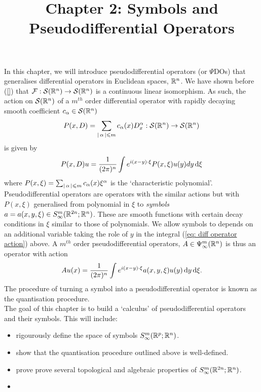 \documentclass[12pt]{article}
\title{Chapter 2: Symbols and Pseudodifferential Operators}
\date{}
\begin{document}
\maketitle
In this chapter, we will introduce pseudodifferential operators (or $\Psi$DOs) that generalises differential operators in Euclidean spaces, $\R^n$. We have shown before (\ref{}) that $\F : \sch(\R^n) \to \sch(\R^n)$ is a continuous linear isomorphism. As such, the action on $\sch(\R^n)$ of a $m^{th}$ order differential operator with rapidly decaying smooth coefficient $c_\alpha \in \sch(\R^n)$ 
\begin{align}
P(x, D) = \sum_{\abs{\alpha} \leq m } c_\alpha(x) D^\alpha_x : \sch(\R^n) \to \sch(\R^n) \label{eq: general diff op} 
\end{align}
is given by 
\begin{align}
P(x, D)u = \frac{1}{(2\pi)^n} \int e^{i (x - y) \cdot \xi} P(x, \xi) u(y) dy \d[\xi]  \label{eq: diff operator action} 
\end{align}
where $P(x, \xi) = \sum_{\abs{\alpha} \leq m} c_\alpha(x) \xi^\alpha$ is the `characteristic polynomial'. \\

Pseudodifferential operators are operators with the similar actions but with $P(x, \xi)$ generalised from polynomial in $\xi$ to \textit{symbols} $a = a(x, y, \xi) \in S^m_\infty(\R^{2n}; \R^n)$. These are smooth functions with certain decay conditions in $\xi$ similar to those of polynomials. We allow symbols to depends on an additional variable taking the role of $y$ in the integral (\ref{eq: diff operator action}) above. A $m^{th}$ order pseudodifferential operators, $A \in \Psi^{m}_{\infty}(\R^n)$ is thus an operator with action 
\begin{align*}
Au(x) = \frac{1}{(2\pi)^n} \int e^{i (x - y) \cdot \xi} a(x, y, \xi) u(y) \d[y] \d[\xi]. 
\end{align*}
The procedure of turning a symbol into a pseudodifferential operator is known as the quantisation procedure. \\

The goal of this chapter is to build a `calculus' of pseudodifferential operators and their symbols. This will include: 
\begin{itemize}
    \item rigourously define the space of symbols $S^{m}_{\infty}(\R^{p}; \R^{n})$. 
    \item show that the quantisation procedure outlined above is well-defined. 
    \item prove prove several topological and algebraic properties of $S^{m}_{\infty}(\R^{2n}; \R^{n})$. 
    \item {}
\end{itemize} 
\end{document}
